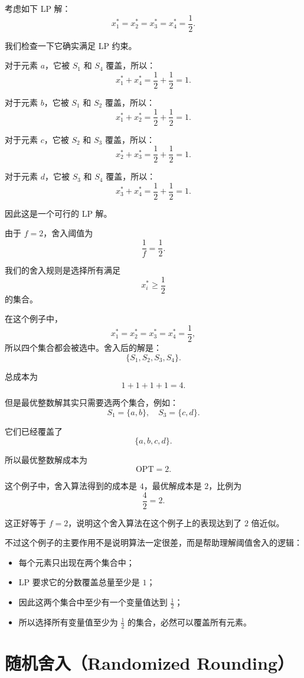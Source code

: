 \documentclass[UTF8,openany,12pt]{ctexbook}
\theoremstyle{remark}
\newcommand{\OPT}{\mathrm{OPT}}
\begin{document}
考虑如下 LP 解：
\[
x_1^* = x_2^* = x_3^* = x_4^* = \frac{1}{2}.
\]

我们检查一下它确实满足 LP 约束。

对于元素 $a$，它被 $S_1$ 和 $S_4$ 覆盖，所以：
\[
x_1^* + x_4^* = \frac{1}{2} + \frac{1}{2} = 1.
\]

对于元素 $b$，它被 $S_1$ 和 $S_2$ 覆盖，所以：
\[
x_1^* + x_2^* = \frac{1}{2} + \frac{1}{2} = 1.
\]

对于元素 $c$，它被 $S_2$ 和 $S_3$ 覆盖，所以：
\[
x_2^* + x_3^* = \frac{1}{2} + \frac{1}{2} = 1.
\]

对于元素 $d$，它被 $S_3$ 和 $S_4$ 覆盖，所以：
\[
x_3^* + x_4^* = \frac{1}{2} + \frac{1}{2} = 1.
\]

因此这是一个可行的 LP 解。

由于 $f=2$，舍入阈值为
\[
\frac{1}{f} = \frac{1}{2}.
\]

我们的舍入规则是选择所有满足
\[
x_i^* \ge \frac{1}{2}
\]
的集合。

在这个例子中，
\[
x_1^* = x_2^* = x_3^* = x_4^* = \frac{1}{2},
\]
所以四个集合都会被选中。舍入后的解是：
\[
\{S_1,S_2,S_3,S_4\}.
\]

总成本为
\[
1+1+1+1 = 4.
\]

但是最优整数解其实只需要选两个集合，例如：
\[
S_1 = \{a,b\}, \quad S_3 = \{c,d\}.
\]

它们已经覆盖了
\[
\{a,b,c,d\}.
\]

所以最优整数解成本为
\[
\OPT = 2.
\]

这个例子中，舍入算法得到的成本是 $4$，最优解成本是 $2$，比例为
\[
\frac{4}{2} = 2.
\]

这正好等于 $f=2$，说明这个舍入算法在这个例子上的表现达到了 $2$ 倍近似。

不过这个例子的主要作用不是说明算法一定很差，而是帮助理解阈值舍入的逻辑：

\begin{itemize}
    \item 每个元素只出现在两个集合中；
    \item LP 要求它的分数覆盖总量至少是 $1$；
    \item 因此这两个集合中至少有一个变量值达到 $\frac{1}{2}$；
    \item 所以选择所有变量值至少为 $\frac{1}{2}$ 的集合，必然可以覆盖所有元素。
\end{itemize}

\section{随机舍入（Randomized Rounding）}
\end{document}
